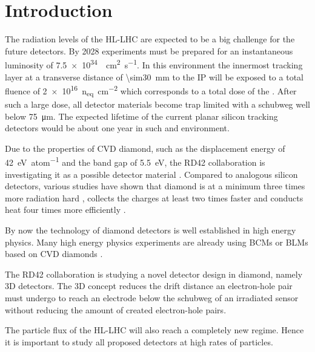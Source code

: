 \section{Introduction}
The radiation levels of the \ac{HL-LHC} are expected to be a big challenge for the future detectors. By 2028 experiments must be prepared for an instantaneous luminosity of \SI{7.5e34}{\per\centi\meter\squared\per\second}. In this environment the innermost tracking layer at a transverse distance of \SI{\sim30}{\milli\meter} to the \acl{IP} will be exposed to a total fluence of \SI{2e16}{n_{eq}\per\centi\meter^2} which corresponds to a total dose of the  \cite{dose}. After such a large dose, all detector materials become trap limited with a schubweg well below \SI{75}{\micro\meter}.  The expected lifetime of the current planar silicon tracking detectors would be about one year in such and environment.\par
Due to the properties of \ac{CVD} diamond, such as the displacement energy of \SI{42}{\electronvolt\per atom} and the band gap of \SI{5.5}{\electronvolt}, the RD42 collaboration is investigating it as a possible detector material \cite{rd42}. Compared to analogous silicon detectors,  various studies have shown that diamond is at a minimum three times more radiation hard \cite{deboer}, collects the charges at least two times faster \cite{pernegger} and conducts heat four times more efficiently \cite{zhao}.\par
By now the technology of diamond detectors is well established in high energy physics. Many high energy physics experiments are already using \aclp{BCM} or \aclp{BLM} based on \ac{CVD} diamonds \cite{babar, bcm, dbm1}.\par
The RD42 collaboration is studying a novel detector design in diamond, namely 3D detectors. The 3D concept reduces the drift distance an electron-hole pair must undergo to reach an electrode below the schubweg of an irradiated sensor without reducing the amount of created electron-hole pairs.\par
The particle flux of the \ac{HL-LHC} will also reach a completely new regime. Hence it is important to study all proposed detectors at high rates of particles.
